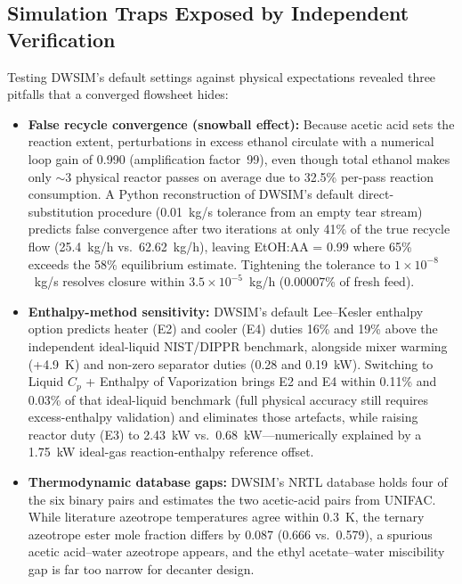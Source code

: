 \documentclass[10pt,a4paper]{article}
\begin{document}
\subsection*{Simulation Traps Exposed by Independent Verification}
Testing DWSIM's default settings against physical expectations revealed three pitfalls that a converged flowsheet hides:
\begin{itemize}
  \item \textbf{False recycle convergence (snowball effect):} Because acetic acid sets the reaction extent, perturbations in excess ethanol circulate with a numerical loop gain of 0.990 (amplification factor~99), even though total ethanol makes only $\sim$3 physical reactor passes on average due to 32.5\% per-pass reaction consumption. A Python reconstruction of DWSIM's default direct-substitution procedure (0.01~kg/s tolerance from an empty tear stream) predicts false convergence after two iterations at only 41\% of the true recycle flow (25.4~kg/h vs.\ 62.62~kg/h), leaving EtOH:AA = 0.99 where 65\% exceeds the 58\% equilibrium estimate. Tightening the tolerance to $1 \times 10^{-8}$~kg/s resolves closure within $3.5 \times 10^{-5}$~kg/h (0.00007\% of fresh feed).
  \item \textbf{Enthalpy-method sensitivity:} DWSIM's default Lee--Kesler enthalpy option predicts heater (E2) and cooler (E4) duties 16\% and 19\% above the independent ideal-liquid NIST/DIPPR benchmark, alongside mixer warming (+4.9~K) and non-zero separator duties (0.28 and 0.19~kW). Switching to Liquid $C_p$ + Enthalpy of Vaporization brings E2 and E4 within 0.11\% and 0.03\% of that ideal-liquid benchmark (full physical accuracy still requires excess-enthalpy validation) and eliminates those artefacts, while raising reactor duty (E3) to 2.43~kW vs.\ 0.68~kW---numerically explained by a 1.75~kW ideal-gas reaction-enthalpy reference offset.
  \item \textbf{Thermodynamic database gaps:} DWSIM's NRTL database holds four of the six binary pairs and estimates the two acetic-acid pairs from UNIFAC. While literature azeotrope temperatures agree within 0.3~K, the ternary azeotrope ester mole fraction differs by 0.087 (0.666 vs.\ 0.579), a spurious acetic acid--water azeotrope appears, and the ethyl acetate--water miscibility gap is far too narrow for decanter design.
\end{itemize}
\end{document}
